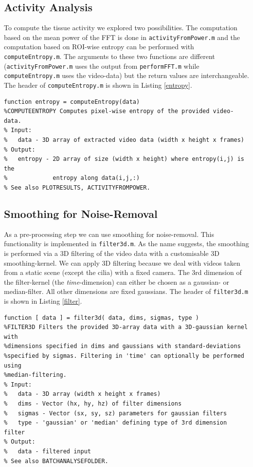 \documentclass[11pt]{scrartcl}
\begin{document}
\subsection{Activity Analysis}

To compute the tissue activity we explored two possibilities. The computation based on the mean power of the FFT is done in \texttt{activityFromPower.m} and the computation based on ROI-wise entropy can be performed with \texttt{computeEntropy.m}. The arguments to these two functions are different (\texttt{activityFromPower.m} uses the output from \texttt{performFFT.m} while \texttt{computeEntropy.m} uses the video-data) but the return values are interchangeable.  The header of \texttt{computeEntropy.m} is shown in Listing \ref{entropy}.

\begin{minipage}{\linewidth}
  \begin{lstlisting}[caption={Function performing the activity analysis using entropy.}, label=entropy]
function entropy = computeEntropy(data) 
%COMPUTEENTROPY Computes pixel-wise entropy of the provided video-data.
% Input:
%   data - 3D array of extracted video data (width x height x frames)
% Output:
%   entropy - 2D array of size (width x height) where entropy(i,j) is the
%             entropy along data(i,j,:)
% See also PLOTRESULTS, ACTIVITYFROMPOWER.
  \end{lstlisting}
\end{minipage}

\subsection{Smoothing for Noise-Removal}

As a pre-processing step we can use smoothing for noise-removal. This functionality is implemented in \texttt{filter3d.m}. As the name suggests, the smoothing is performed via a 3D filtering of the video data with a customisable 3D smoothing-kernel. We can apply 3D filtering because we deal with videos taken from a static scene (except the cilia) with a fixed camera. The 3rd dimension of the filter-kernel (the \textit{time}-dimension) can either be chosen as a gaussian- or median-filter. All other dimensions are fixed gaussians. The header of \texttt{filter3d.m} is shown in Listing \ref{filter}.


\begin{minipage}{\linewidth}
  \begin{lstlisting}[caption={Function performing the noise removal.}, label=filter]
function [ data ] = filter3d( data, dims, sigmas, type )
%FILTER3D Filters the provided 3D-array data with a 3D-gaussian kernel with
%dimensions specified in dims and gaussians with standard-deviations
%specified by sigmas. Filtering in 'time' can optionally be performed using
%median-filtering.
% Input:
%   data - 3D array (width x height x frames)
%   dims - Vector (hx, hy, hz) of filter dimensions
%   sigmas - Vector (sx, sy, sz) parameters for gaussian filters
%   type - 'gaussian' or 'median' defining type of 3rd dimension filter
% Output:
%   data - filtered input
% See also BATCHANALYSEFOLDER.
  \end{lstlisting}
\end{minipage}
\end{document}
